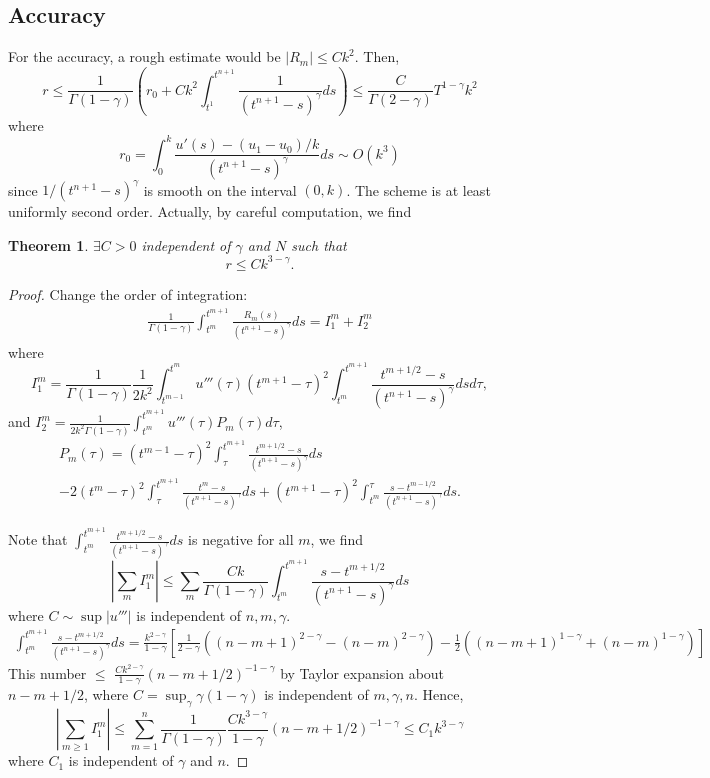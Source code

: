 \documentclass[11pt]{article}
\newtheorem{thm}{Theorem}
\begin{document}
\subsection{Accuracy}
For the accuracy, a rough estimate would be $|R_m|\le Ck^2$. Then, $$
r\le \frac{1}{\Gamma(1-\gamma)}(r_0+Ck^2\int_{t^1}^{t^{n+1}}\frac{1}{(t^{n+1}-s)^{\gamma}}ds)\le \frac{C}{\Gamma(2-\gamma)}T^{1-\gamma}k^2
$$
where $$
r_0=\int_0^k\frac{u'(s)-(u_1-u_0)/k}{(t^{n+1}-s)^{\gamma}}ds
\sim 
O(k^3)
$$
since $1/(t^{n+1}-s)^{\gamma}$ is smooth on the interval $(0, k)$.
The scheme is at least uniformly second order. Actually, by careful computation, we find
\begin{thm}
$\exists C>0$ independent of $\gamma$ and $N$ such that $$
r\le Ck^{3-\gamma}.
$$
\end{thm}
\begin{proof}
Change the order of integration: 
\begin{gather*}
\frac{1}{\Gamma(1-\gamma)}\int_{t^m}^{t^{m+1}}\frac{R_m(s)}{(t^{n+1}-s)^{\gamma}}ds=I_1^m+I_2^m
\end{gather*}
where $$
I_1^m=\frac{1}{\Gamma(1-\gamma)}\frac{1}{2k^2}\int_{t^{m-1}}^{t^{m}}
u'''(\tau)(t^{m+1}-\tau)^2\int_{t^m}^{t^{m+1}}\frac{t^{m+1/2}-s}{(t^{n+1}-s)^{\gamma}}dsd\tau,
$$
and $I_2^m=\frac{1}{2k^2\Gamma(1-\gamma)}\int_{t^m}^{t^{m+1}}u'''(\tau)P_m(\tau)d\tau$,
\begin{multline*}
P_m(\tau)=(t^{m-1}-\tau)^2\int_{\tau}^{t^{m+1}}\frac{t^{m+1/2}-s}{(t^{n+1}-s)^{\gamma}}ds\\
-2(t^m-\tau)^2\int_{\tau}^{t^{m+1}}\frac{t^{m}-s}{(t^{n+1}-s)^{\gamma}}ds
+(t^{m+1}-\tau)^2\int_{t^m}^{\tau}\frac{s-t^{m-1/2}}{(t^{n+1}-s)^{\gamma}}ds.
\end{multline*}

Note that $\int_{t^m}^{t^{m+1}}\frac{t^{m+1/2}-s}{(t^{n+1}-s)^{\gamma}}ds$
is negative for all $m$, we find $$
|\sum_m I_1^m|\le \sum_m \frac{Ck}{\Gamma(1-\gamma)}\int_{t^m}^{t^{m+1}}\frac{s-t^{m+1/2}}{(t^{n+1}-s)^{\gamma}}ds
$$
where $C\sim \sup|u'''|$ is independent of $n,m,\gamma$.
\begin{multline*}
\int_{t^m}^{t^{m+1}}\frac{s-t^{m+1/2}}{(t^{n+1}-s)^{\gamma}}ds
=\frac{k^{2-\gamma}}{1-\gamma}[
\frac{1}{2-\gamma}((n-m+1)^{2-\gamma}-(n-m)^{2-\gamma})
-\frac{1}{2}((n-m+1)^{1-\gamma}+(n-m)^{1-\gamma})]
\end{multline*}
This number $\le$ $\frac{Ck^{2-\gamma}}{1-\gamma}(n-m+1/2)^{-1-\gamma}$ by Taylor expansion about $n-m+1/2$, where $C=\sup_{\gamma}\gamma(1-\gamma)$ is independent of $m,\gamma, n$. Hence, $$
|\sum_{m\ge 1} I_1^m|\le \sum_{m=1}^n
\frac{1}{\Gamma(1-\gamma)}\frac{Ck^{3-\gamma}}{1-\gamma}(n-m+1/2)^{-1-\gamma}\le C_1k^{3-\gamma}
$$
where $C_1$ is independent of $\gamma$ and $n$.


\end{proof}
\end{document}
